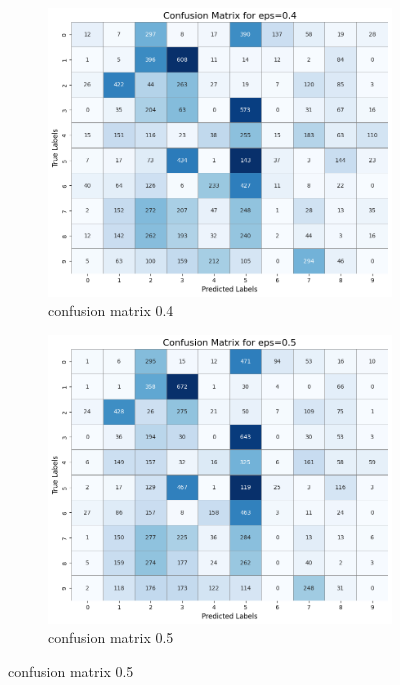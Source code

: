 \documentclass[11pt,onside]{article}
\begin{document}
\begin{figure}[h]
  \centering
  \begin{subfigure}[b]{0.49\textwidth}
    \centering
    \includegraphics[width=\textwidth]{V2_images/target_confusion_matrix_eps_0.4_attack_1.png}
    \caption{confusion matrix 0.4 }
    \label{fig:image1}
  \end{subfigure}
  \hfill
  \begin{subfigure}[b]{0.49\textwidth}
    \centering
    \includegraphics[width=\textwidth]{V2_images/target_confusion_matrix_eps_0.5_attack_1.png}
    \caption{confusion matrix 0.5 }
    \label{fig:image2}
  \end{subfigure}
  
  \label{fig:images}
\end{figure}
\end{document}
